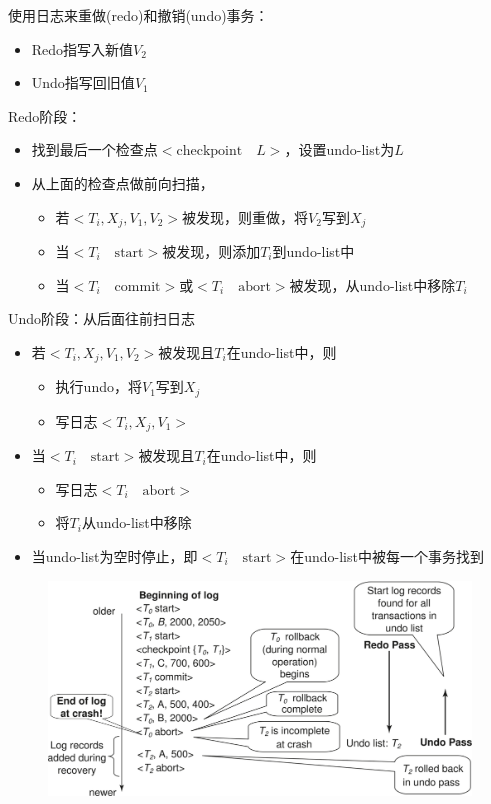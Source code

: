 使用日志来重做(redo)和撤销(undo)事务：
\begin{itemize}
	\item Redo指写入新值$V_2$
	\item Undo指写回旧值$V_1$
\end{itemize}

Redo阶段：
\begin{itemize}
	\item 找到最后一个检查点$<\text{checkpoint}\quad L>$，设置undo-list为$L$
	\item 从上面的检查点做前向扫描，
	\begin{itemize}
		\item 若$<T_i,X_j,V_1,V_2>$被发现，则重做，将$V_2$写到$X_j$
		\item 当$<T_i\quad\text{start}>$被发现，则添加$T_i$到undo-list中
		\item 当$<T_i\quad\text{commit}>$或$<T_i\quad\text{abort}>$被发现，从undo-list中移除$T_i$
	\end{itemize}
\end{itemize}

Undo阶段：从后面往前扫日志
\begin{itemize}
	\item 若$<T_i,X_j,V_1,V_2>$被发现且$T_i$在undo-list中，则
	\begin{itemize}
		\item 执行undo，将$V_1$写到$X_j$
		\item 写日志$<T_i,X_j,V_1>$
	\end{itemize}
	\item 当$<T_i\quad\text{start}>$被发现且$T_i$在undo-list中，则
	\begin{itemize}
		\item 写日志$<T_i\quad\text{abort}>$
		\item 将$T_i$从undo-list中移除
	\end{itemize}
	\item 当undo-list为空时停止，即$<T_i\quad\text{start}>$在undo-list中被每一个事务找到
\end{itemize}
\begin{figure}[H]
\centering
\includegraphics[width=0.8\linewidth]{fig/recovery.png}
\end{figure}

